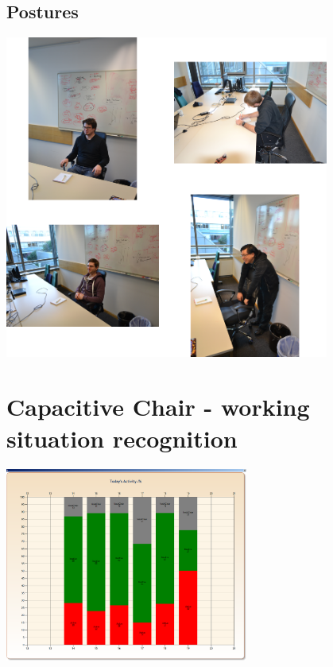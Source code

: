 \subsection{Postures}
\begin{minipage}{\linewidth}
\centering
\includegraphics[width=0.8\textwidth]{images/app_eval_chair1}
\label{fig:disc_unob_elec}
\end{minipage}

\section{Capacitive Chair - working situation recognition}
\begin{minipage}{\linewidth}
\centering
\includegraphics[width=0.6\textwidth]{images/workact_day1}
\label{fig:workact_day1}
\end{minipage}

